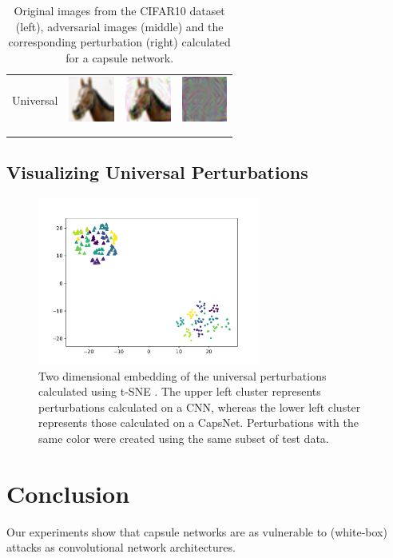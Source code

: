 \documentclass{article}
\begin{document}
\begin{table}[h]
\begin{tabular}{rlll}
	\\
	Universal & \includegraphics[height=1.5cm, align=c]{figures/universal_orig.pdf} & \includegraphics[height=1.5cm, align=c]{figures/universal_adversarial.pdf} & \includegraphics[height=1.5cm, align=c]{figures/universal_diff.pdf}\\
	\\
	\vspace{0.1cm}\\
	\end{tabular}
	\label{tab:images}
	\caption{Original images from the CIFAR10 dataset (left), adversarial images (middle) and the corresponding perturbation (right) calculated for a capsule network.}
\end{table}

\subsection{Visualizing Universal Perturbations}

\begin{figure}
	\centering
	\includegraphics[height=5.5cm]{figures/tsne.pdf}
	\caption{Two dimensional embedding of the universal perturbations calculated using t-SNE \cite{tsne}. The upper left cluster represents perturbations calculated on a CNN, whereas the lower left cluster represents those calculated on a CapsNet. Perturbations with the same color were created using the same subset of test data.}
\end{figure}


\FloatBarrier
\section{Conclusion}
Our experiments show that capsule networks are as vulnerable to (white-box) attacks as convolutional network architectures.



\end{document}
